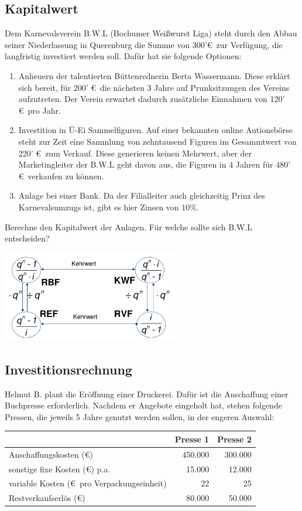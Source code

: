 \documentclass[11pt, a4paper]{article}
\begin{document}
\subsection{Kapitalwert}
Dem Karnevalsverein B.W.L (Bochumer Weißwurst Liga) steht durch den Abbau seiner Niederlassung in Querenburg die Summe von 300'\euro \ zur Verfügung, die langfristig investiert werden soll. Dafür hat sie folgende Optionen:
\begin{enumerate}
	\item Anheuern der talentierten Büttenrednerin Berta Wassermann. Diese erklärt sich bereit, für 200' \euro \ die nächsten 3 Jahre auf Prunksitzungen des Vereins aufzutreten. Der Verein erwartet dadurch zusätzliche Einnahmen von 120' \euro \ pro Jahr.
	\item Investition in Ü-Ei Sammelfiguren. Auf einer bekannten online Autionsbörse steht zur Zeit eine Sammlung von zehntausend Figuren im Gesammtwert von 220' \euro \ zum Verkauf. Diese generieren keinen Mehrwert, aber der Marketingleiter der B.W.L geht davon aus, die Figuren in 4 Jahren für 480' \euro \ verkaufen zu können.
	\item Anlage bei einer Bank. Da der Filialleiter auch gleichzeitig Prinz des Karnevalsumzugs ist, gibt es hier Zinsen von 10\%.
\end{enumerate}
Berechne den Kapitalwert der Anlagen. Für welche sollte sich B.W.L entscheiden?

\includegraphics[height=4cm]{RentenUndKapitalfaktoren.png}

\subsection{Investitionsrechnung}
Helmut B. plant die Eröffnung einer Druckerei. Dafür ist die Anschaffung einer Buchpresse erforderlich. Nachdem er Angebote eingeholt hat, stehen folgende Pressen, die jeweils 5 Jahre genutzt werden sollen, in der engeren Auswahl:

\vspace{\baselineskip}
\begin{tabular}{l|r|r}
	& Presse 1 & Presse 2 \\ \hline
	Anschaffungskosten (\euro) & 450.000 & 300.000 \\
	sonstige fixe Kosten (\euro) p.a. & 15.000 & 12.000 \\
	variable Kosten (\euro \ pro Verpackungseinheit) & 22 & 25 \\
	Restverkaufserlös (\euro) & 80.000 & 50.000
\end{tabular}
\end{document}
